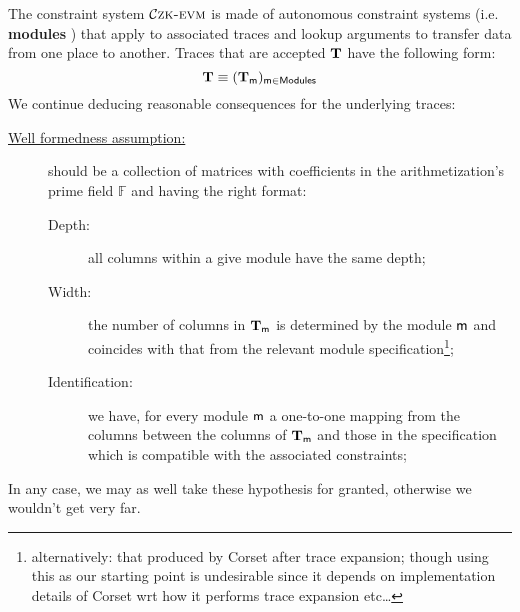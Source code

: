 The \zkEvm{} constraint system $\mathcal{C}\textsc{zk-evm}$ is made of autonomous constraint systems (i.e. \textbf{modules} \moduleName{}) that apply to associated traces and lookup arguments to transfer data from one place to another. Traces that are accepted $\textbf{T}$ have the following form:
\[ \textbf{T} \equiv (\textbf{T}_{\textsf{m}})_{\textsf{m} \in \textsf{Modules}} \]
We continue deducing reasonable consequences for the underlying traces:
\begin{description}
	\item[\quad \underline{Well formedness assumption:}] \fullTrace{} should be a collection of matrices with coefficients in the arithmetization's prime field $\mathbb{F}$ and having the right format:
		\begin{description}
			\item[\quad Depth:] all columns within a give module have the same depth;
			\item[\quad Width:] the number of columns in $\textbf{T}_{\textsf{m}}$ is determined by the module $\textsf{m}$ and coincides with that from the relevant module specification\footnote{alternatively: that produced by Corset after trace expansion; though using this as our starting point is undesirable since it depends on implementation details of Corset wrt how it performs trace expansion etc\dots{}};
			\item[\quad Identification:] we have, for every module $\textsf{m}$ a one-to-one mapping from the columns between the columns of $\textbf{T}_{\textsf{m}}$ and those in the specification which is compatible with the associated constraints;
		\end{description}
\end{description}
In any case, we may as well take these hypothesis for granted, otherwise we wouldn't get very far.



